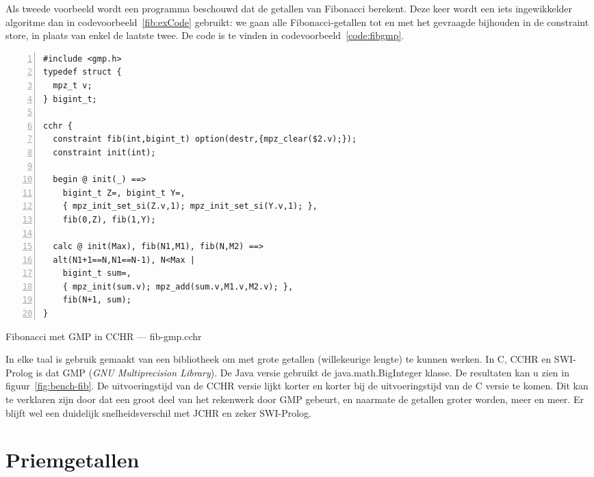 Als tweede voorbeeld wordt een programma beschouwd dat de getallen van Fibonacci berekent. Deze keer wordt een iets ingewikkelder algoritme dan in codevoorbeeld~\ref{fib:exCode} gebruikt: we gaan alle Fibonacci-getallen tot en met het gevraagde bijhouden in de constraint store, in plaats van enkel de laatste twee. De code is te vinden in codevoorbeeld~\ref{code:fibgmp}.
\begin{exCode}
\begin{Verbatim}[frame=single,numbers=left]
#include <gmp.h>
typedef struct {
  mpz_t v;
} bigint_t;

cchr {
  constraint fib(int,bigint_t) option(destr,{mpz_clear($2.v);});
  constraint init(int);
  
  begin @ init(_) ==> 
    bigint_t Z=, bigint_t Y=, 
    { mpz_init_set_si(Z.v,1); mpz_init_set_si(Y.v,1); },
    fib(0,Z), fib(1,Y);

  calc @ init(Max), fib(N1,M1), fib(N,M2) ==>
  alt(N1+1==N,N1==N-1), N<Max |
    bigint_t sum=,
    { mpz_init(sum.v); mpz_add(sum.v,M1.v,M2.v); },
    fib(N+1, sum);
}
\end{Verbatim}
\caption{\label{code:fibgmp} Fibonacci met GMP in CCHR --- fib-gmp.cchr}
\end{exCode}
In elke taal is gebruik gemaakt van een bibliotheek om met grote getallen (willekeurige lengte) te kunnen werken. In C, CCHR en SWI-Prolog is dat GMP ({\em GNU Multiprecision Library}). De Java versie gebruikt de java.math.BigInteger klasse. De resultaten kan u zien in figuur~\ref{fig:bench-fib}. De uitvoeringstijd van de CCHR versie lijkt korter en korter bij de uitvoeringstijd van de C versie te komen. Dit kan te verklaren zijn door dat een groot deel van het rekenwerk door GMP gebeurt, en naarmate de getallen groter worden, meer en meer. Er blijft wel een duidelijk snelheidsverschil met JCHR en zeker SWI-Prolog.

\section{Priemgetallen} \label{sec:bench-primes}

